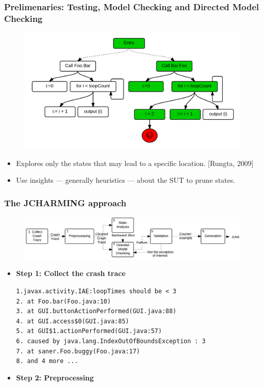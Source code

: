 \documentclass{beamer}
\begin{document}
\begin{frame}
\frametitle{Prelimenaries: Testing, Model Checking and \textbf{Directed Model Checking}}

\begin{figure}
\includegraphics[width=0.75\linewidth]{media/dmc.png}
\end{figure}

\begin{itemize}
\item Explores only the states that may lead to a
specific location. [Rungta, 2009]
\item Use insights --- generally heuristics --- about the SUT to prune states.
\end{itemize}

\end{frame}

\begin{frame}
\frametitle{The JCHARMING approach}

\begin{figure}
\includegraphics[width=0.97\linewidth]{media/approach.png}
\end{figure}

\begin{itemize}
\item \textbf{Step 1: Collect the crash trace}

\begin{small}
\texttt{1.javax.activity.IAE:loopTimes
should be < 3\\
2. at Foo.bar(Foo.java:10)\\
3. at GUI.buttonActionPerformed(GUI.java:88)\\
4. at GUI.access\$0(GUI.java:85)\\
5. at GUI\$1.actionPerformed(GUI.java:57)\\
6. caused by java.lang.IndexOutOfBoundsException : 3\\
7. at saner.Foo.buggy(Foo.java:17)\\
8. and 4 more ...\\}
\end{small}

\item \textbf{Step 2: Preprocessing}

\end{itemize}

\end{frame}
\end{document}

